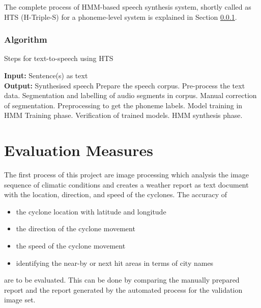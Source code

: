 \documentclass{article}
\begin{document}
The complete process of HMM-based speech synthesis system, shortly called as HTS 
(H-Triple-S) for a phoneme-level system is explained in Section \ref{ssec:tts_algo}.

\subsubsection{Algorithm}
\label{ssec:tts_algo}

\begin{algorithm}[!th]
\caption{Steps for text-to-speech using HTS }
\label{algo:hts}
\begin{algorithmic}[1]

\STATE  \textbf{Input:} Sentence(s) as text \\
\textbf{Output:} Synthesised speech
\STATE Prepare the speech corpus.
\STATE Pre-process the text data.
\STATE Segmentation and labelling of audio segments in corpus.
\STATE Manual correction of segmentation.
\STATE Preprocessing to get the phoneme labels.
\STATE Model training in HMM Training phase.
\STATE Verification of trained models.
\STATE HMM synthesis phase.
\end{algorithmic}
\end{algorithm}

\section{Evaluation Measures}
\label{sec:evalMeasures}
The first process of this project are image processing which analysis the image sequence
of climatic conditions and creates a weather report as text document with the location, direction, and speed of the cyclones. The accuracy of 
\begin{itemize}
\item the cyclone location with latitude and longitude
\item the direction of the cyclone movement
\item the speed of the cyclone movement
\item identifying the near-by or next hit areas in terms of city names
\end{itemize} are to be evaluated. This can be done by comparing the manually prepared report and the report generated by the automated process for the validation image set.
\end{document}
